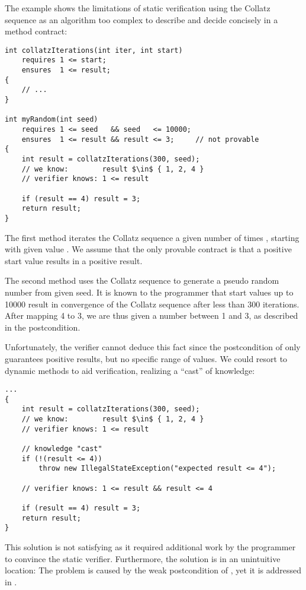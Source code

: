 The example shows the limitations of static verification using the Collatz sequence as an algorithm too complex to describe and decide concisely in a method contract:
\begin{lstlisting}
int collatzIterations(int iter, int start)
    requires 1 <= start;
    ensures  1 <= result;
{
    // ...
}

int myRandom(int seed)
    requires 1 <= seed   && seed   <= 10000;
    ensures  1 <= result && result <= 3;     // not provable
{
    int result = collatzIterations(300, seed);
    // we know:        result $\in$ { 1, 2, 4 }
    // verifier knows: 1 <= result
    
    if (result == 4) result = 3;
    return result;
}
\end{lstlisting}
The first method  iterates the Collatz sequence a given number of times , starting with given value .
We assume that the only provable contract is that a positive start value results in a positive result.

The second method  uses the Collatz sequence to generate a pseudo random number from given seed.
It is known to the programmer that start values up to 10000 result in convergence of the Collatz sequence after less than 300 iterations.
After mapping 4 to 3, we are thus given a number between 1 and 3, as described in the postcondition.

Unfortunately, the verifier cannot deduce this fact since the postcondition of  only guarantees positive results, but no specific range of values.
We could resort to dynamic methods to aid verification, realizing a “cast” of knowledge:

\begin{lstlisting}
...
{
    int result = collatzIterations(300, seed);
    // we know:        result $\in$ { 1, 2, 4 }
    // verifier knows: 1 <= result
    
    // knowledge "cast"
    if (!(result <= 4))
        throw new IllegalStateException("expected result <= 4");

    // verifier knows: 1 <= result && result <= 4 
    
    if (result == 4) result = 3;
    return result;
}
\end{lstlisting}

This solution is not satisfying as it required additional work by the programmer to convince the static verifier.
Furthermore, the solution is in an unintuitive location:
The problem is caused by the weak postcondition of , yet it is addressed in .

